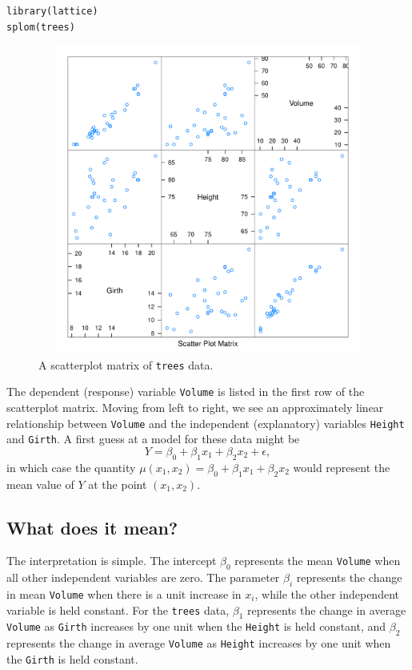 \documentclass[captions=tableheading]{scrbook}
\begin{document}
\begin{example}
\begin{verbatim}
library(lattice)
splom(trees)
\end{verbatim}



\begin{figure}[th]
    \includegraphics[width=5in, height=4in]{img/splom-trees.pdf}
    \caption[Scatterplot matrix of \texttt{trees} data]{\small A scatterplot matrix of \texttt{trees} data.}
    \label{fig:splom-trees}
  \end{figure}

The dependent (response) variable \texttt{Volume} is listed in the first row of the scatterplot matrix. Moving from left to right, we see an approximately linear relationship between \texttt{Volume} and the independent (explanatory) variables \texttt{Height} and \texttt{Girth}. A first guess at a model for these data might be
\begin{equation}
Y=\beta_{0}+\beta_{1}x_{1}+\beta_{2}x_{2}+\epsilon,
\end{equation}
in which case the quantity \(\mu(x_{1},x_{2})=\beta_{0}+\beta_{1}x_{1}+\beta_{2}x_{2}\) would represent the mean value of \(Y\) at the point \((x_{1},x_{2})\).
\end{example}
\subsection{What does it mean?}
\label{sec-12-1-1}


The interpretation is simple. The intercept \(\beta_{0}\) represents the mean \texttt{Volume} when all other independent variables are zero. The parameter \(\beta_{i}\) represents the change in mean \texttt{Volume} when there is a unit increase in \(x_{i}\), while the other independent variable is held constant. For the \texttt{trees} data, \(\beta_{1}\) represents the change in average \texttt{Volume} as \texttt{Girth} increases by one unit when the \texttt{Height} is held constant, and \(\beta_{2}\) represents the change in average \texttt{Volume} as \texttt{Height} increases by one unit when the \texttt{Girth} is held constant. 
\end{document}
